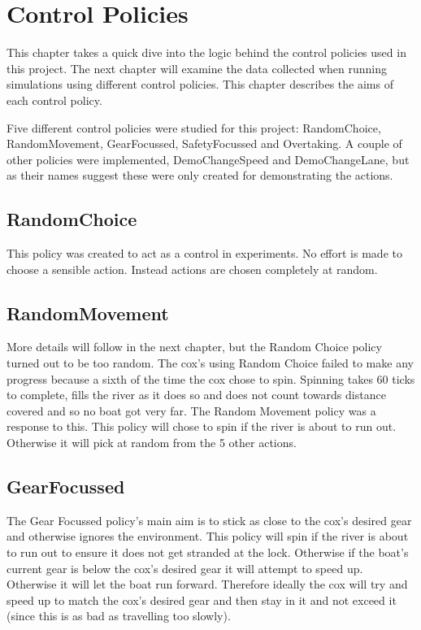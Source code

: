 \chapter{Control Policies}

This chapter takes a quick dive into the logic behind the control policies used in this project. The next chapter will examine the data collected when running simulations using different control policies. This chapter describes the aims of each control policy.

Five different control policies were studied for this project: RandomChoice, RandomMovement, GearFocussed, SafetyFocussed and Overtaking. A couple of other policies were implemented, DemoChangeSpeed and DemoChangeLane, but as their names suggest these were only created for demonstrating the actions.

\section{RandomChoice}
This policy was created to act as a control in experiments. No effort is made to choose a sensible action. Instead actions are chosen completely at random.

\section{RandomMovement}

More details will follow in the next chapter, but the Random Choice policy turned out to be too random. The cox's using Random Choice failed to make any progress because a sixth of the time the cox chose to spin. Spinning takes 60 ticks to complete, fills the river as it does so and does not count towards distance covered and so no boat got very far. The Random Movement policy was a response to this. This policy will chose to spin if the river is about to run out. Otherwise it will pick at random from the 5 other actions.

\section{GearFocussed}

The Gear Focussed policy's main aim is to stick as close to the cox's desired gear and otherwise ignores the environment. This policy will spin if the river is about to run out to ensure it does not get stranded at the lock. Otherwise if the boat's current gear is below the cox's desired gear it will attempt to speed up. Otherwise it will let the boat run forward. Therefore ideally the cox will try and speed up to match the cox's desired gear and then stay in it and not exceed it (since this is as bad as travelling too slowly).


